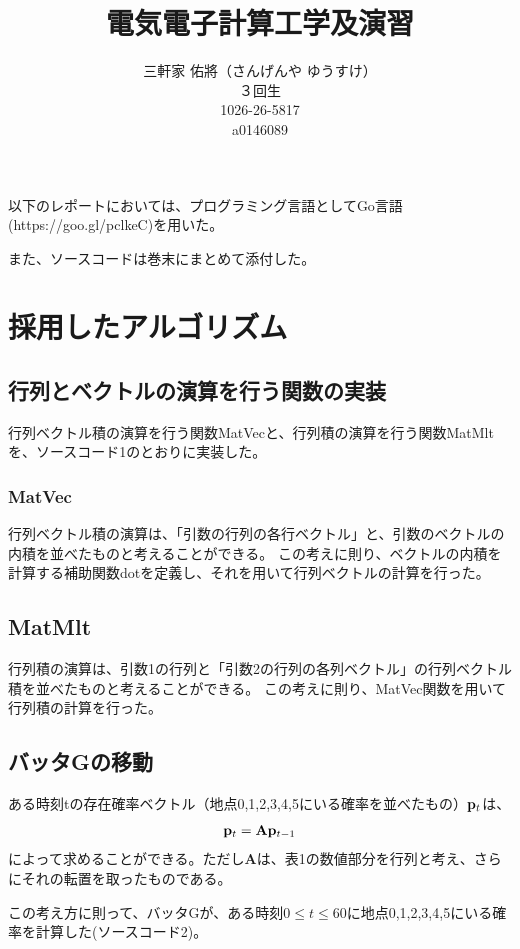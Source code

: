 \documentclass[11pt]{ltjsarticle}
\title{電気電子計算工学及演習}
\author{三軒家 佑將（さんげんや ゆうすけ） \\ ３回生 \\ 1026-26-5817 \\ a0146089}
\date{}
\begin{document}
\maketitle


以下のレポートにおいては、プログラミング言語としてGo言語(https://goo.gl/pclkeC)を用いた。

また、ソースコードは巻末にまとめて添付した。

\section{採用したアルゴリズム}
\subsection{行列とベクトルの演算を行う関数の実装}
	行列ベクトル積の演算を行う関数MatVecと、行列積の演算を行う関数MatMltを、ソースコード1のとおりに実装した。
	\subsubsection*{MatVec}
		行列ベクトル積の演算は、「引数の行列の各行ベクトル」と、引数のベクトルの内積を並べたものと考えることができる。
		この考えに則り、ベクトルの内積を計算する補助関数dotを定義し、それを用いて行列ベクトルの計算を行った。
	\subsection*{MatMlt}
		行列積の演算は、引数1の行列と「引数2の行列の各列ベクトル」の行列ベクトル積を並べたものと考えることができる。
		この考えに則り、MatVec関数を用いて行列積の計算を行った。

\subsection{バッタGの移動}
	ある時刻tの存在確率ベクトル（地点0,1,2,3,4,5にいる確率を並べたもの）${\bf p}_t$は、
	\[
		{\bf p}_t = {\bf A}{\bf p}_{t-1}
	\]
	によって求めることができる。ただし{\bf A}は、表1の数値部分を行列と考え、さらにそれの転置を取ったものである。
	
	この考え方に則って、バッタGが、ある時刻$0 \leq t \leq 60$に地点0,1,2,3,4,5にいる確率を計算した(ソースコード2)。
\end{document}
